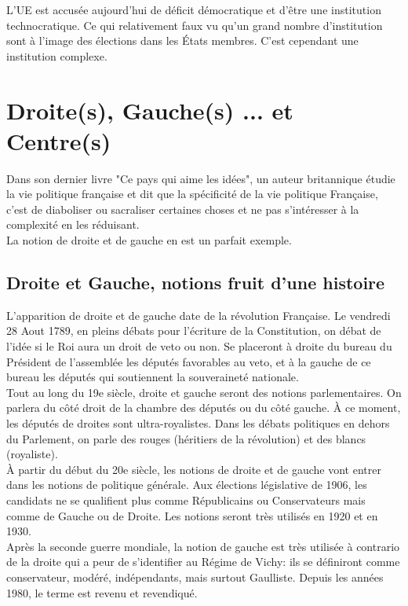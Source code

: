 \documentclass[12pt, a4paper, openany]{book}
\begin{document}
L'UE est accusée aujourd'hui de déficit démocratique et d'être une institution technocratique. Ce qui relativement faux vu qu'un grand nombre d'institution sont à l'image des élections dans les États membres. C'est cependant une institution complexe. 

\chapter{Droite(s), Gauche(s) ... et Centre(s)}

Dans son dernier livre "Ce pays qui aime les idées", un auteur britannique étudie la vie politique française et dit que la spécificité de la vie politique Française, c'est de diaboliser ou sacraliser certaines choses et ne pas s'intéresser à la complexité en les réduisant. \\
La notion de droite et de gauche en est un parfait exemple. 

\section{Droite et Gauche, notions fruit d'une histoire}

L'apparition de droite et de gauche date de la révolution Française. Le vendredi 28 Aout 1789, en pleins débats pour l'écriture de la Constitution, on débat de l'idée si le Roi aura un droit de veto ou non. Se placeront à droite du bureau du Président de l'assemblée les députés favorables au veto, et à la gauche de ce bureau les députés qui soutiennent la souveraineté nationale. \\
Tout au long du 19e siècle, droite et gauche seront des notions parlementaires. On parlera du côté droit de la chambre des députés ou du côté gauche. À ce moment, les députés de droites sont ultra-royalistes. Dans les débats politiques en dehors du Parlement, on parle des rouges (héritiers de la révolution) et des blancs (royaliste). \\
À partir du début du 20e siècle, les notions de droite et de gauche vont entrer dans les notions de politique générale. Aux élections législative de 1906, les candidats ne se qualifient plus comme Républicains ou Conservateurs mais comme de Gauche ou de Droite. Les notions seront très utilisés en 1920 et en 1930. \\
Après la seconde guerre mondiale, la notion de gauche est très utilisée à contrario de la droite qui a peur de s'identifier au Régime de Vichy: ils se définiront comme conservateur, modéré, indépendants, mais surtout Gaulliste. Depuis les années 1980, le terme est revenu et revendiqué. 
\end{document}
